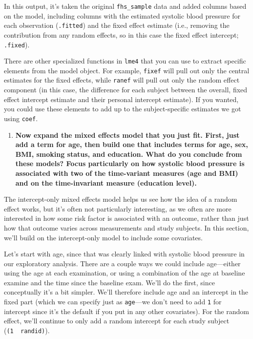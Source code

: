 \documentclass[
]{book}
\providecommand{\tightlist}{%
  \setlength{\itemsep}{0pt}\setlength{\parskip}{0pt}}
\begin{document}
In this output, it's taken the original \texttt{fhs\_sample} data and added columns
based on the model, including columns with the estimated systolic blood pressure
for each observation (\texttt{.fitted}) and the fixed effect estimate (i.e., removing
the contribution from any random effects, so in this case the fixed effect
intercept; \texttt{.fixed}).

There are other specialized functions in \texttt{lme4} that you can use to extract
specific elements from the model object. For example, \texttt{fixef} will pull out only
the central estimates for the fixed effects, while \texttt{ranef} will pull out only
the random effect component (in this case, the difference for each subject
between the overall, fixed effect intercept estimate and their personal intercept
estimate). If you wanted, you could use these elements to add up to the
subject-specific estimates we got using \texttt{coef}.

\begin{enumerate}
\def\labelenumi{\arabic{enumi}.}
\setcounter{enumi}{2}
\tightlist
\item
  \textbf{Now expand the mixed effects model that you just fit. First, just add a
  term for age, then build one that includes terms for age, sex, BMI, smoking
  status, and education. What do you conclude from these models? Focus
  particularly on how systolic blood pressure is associated with two of the
  time-variant measures (age and BMI) and on the time-invariant measure (education
  level).}
\end{enumerate}

The intercept-only mixed effects model helps us see how the idea of a random
effect works, but it's often not particularly interesting, as we often are
more interested in how some risk factor is associated with an outcome, rather
than just how that outcome varies across measurements and study subjects.
In this section, we'll build on the intercept-only model to include some
covariates.

Let's start with age, since that was clearly linked with systolic blood pressure
in our exploratory analysis. There are a couple ways we could include
age---either using the age at each examination, or using a combination of the
age at baseline examine and the time since the baseline exam. We'll do the
first, since conceptually it's a bit simpler. We'll therefore include age and an
intercept in the fixed part (which we can specify just as \texttt{age}---we don't need
to add \texttt{1} for intercept since it's the default if you put in any other
covariates). For the random effect, we'll continue to only add a random
intercept for each study subject (\texttt{(1\ \textbar{}\ randid)}).
\end{document}
